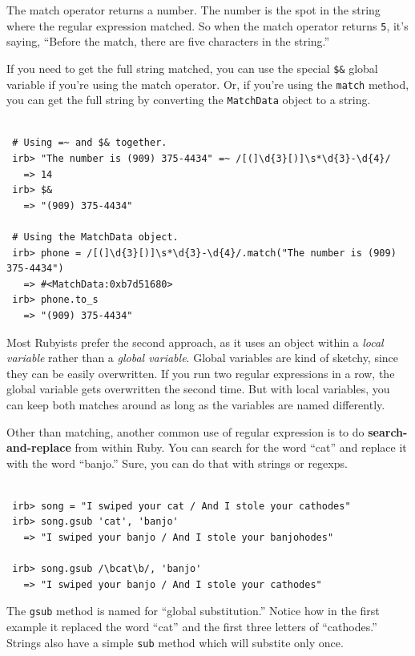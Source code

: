 \documentclass[10pt,twoside]{report}
\begin{document}
The match operator returns a number.  The number is the spot in the
string where the regular expression matched. So when the match
operator returns \lstinline[breaklines=true]|5|, it's saying, ``Before
the match, there are five characters in the string.''

If you need to get the full string matched, you can use the special
\lstinline[breaklines=true]|$&| global variable if you're using the
match operator.  Or, if you're using the
\lstinline[breaklines=true]|match| method, you can get the full string
by converting the \lstinline[breaklines=true]|MatchData| object to a
string.


\begin{lstlisting}

 # Using =~ and $& together.
 irb> "The number is (909) 375-4434" =~ /[(]\d{3}[)]\s*\d{3}-\d{4}/
   => 14
 irb> $&
   => "(909) 375-4434"

 # Using the MatchData object.
 irb> phone = /[(]\d{3}[)]\s*\d{3}-\d{4}/.match("The number is (909) 375-4434")
   => #<MatchData:0xb7d51680>
 irb> phone.to_s
   => "(909) 375-4434"

\end{lstlisting}


Most Rubyists prefer the second approach, as it uses an object within
a {\em local variable} rather than a {\em global variable}. Global
variables are kind of sketchy, since they can be easily overwritten.
If you run two regular expressions in a row, the global variable gets
overwritten the second time.  But with local variables, you can keep
both matches around as long as the variables are named differently.

Other than matching, another common use of regular expression is to do
{\bf search-and-replace} from within Ruby. You can search for the word
``cat'' and replace it with the word ``banjo.''  Sure, you can do that
with strings or regexps.


\begin{lstlisting}

 irb> song = "I swiped your cat / And I stole your cathodes"
 irb> song.gsub 'cat', 'banjo'
   => "I swiped your banjo / And I stole your banjohodes"

 irb> song.gsub /\bcat\b/, 'banjo'
   => "I swiped your banjo / And I stole your cathodes"

\end{lstlisting}


The \lstinline[breaklines=true]|gsub| method is named for ``global
substitution.''  Notice how in the first example it replaced the word
``cat'' and the first three letters of ``cathodes.''  Strings also
have a simple \lstinline[breaklines=true]|sub| method which will
substite only once.
\end{document}
